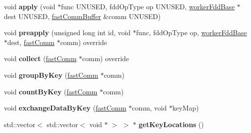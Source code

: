 \begin{DoxyCompactItemize}
\item 
\hypertarget{classfaster_1_1workerFdd_a7b54fa501fd3cd31a27b95cc55b6235a}{}void {\bfseries apply} (void $\ast$func U\+N\+U\+S\+E\+D, fdd\+Op\+Type op U\+N\+U\+S\+E\+D, \hyperlink{classfaster_1_1workerFddBase}{worker\+Fdd\+Base} $\ast$dest U\+N\+U\+S\+E\+D, \hyperlink{classfaster_1_1fastCommBuffer}{fast\+Comm\+Buffer} \&comm U\+N\+U\+S\+E\+D)\label{classfaster_1_1workerFdd_a7b54fa501fd3cd31a27b95cc55b6235a}

\item 
\hypertarget{classfaster_1_1workerFdd_a245c74dd6908a15c8e4310e21c25f867}{}void {\bfseries preapply} (unsigned long int id, void $\ast$func, fdd\+Op\+Type op, \hyperlink{classfaster_1_1workerFddBase}{worker\+Fdd\+Base} $\ast$dest, \hyperlink{classfaster_1_1fastComm}{fast\+Comm} $\ast$comm) override\label{classfaster_1_1workerFdd_a245c74dd6908a15c8e4310e21c25f867}

\item 
\hypertarget{classfaster_1_1workerFdd_a429828080212db643940e5761b9bc27c}{}void {\bfseries collect} (\hyperlink{classfaster_1_1fastComm}{fast\+Comm} $\ast$comm) override\label{classfaster_1_1workerFdd_a429828080212db643940e5761b9bc27c}

\item 
\hypertarget{classfaster_1_1workerFdd_a4e4649c682140139aa4d8e7612086bfd}{}void {\bfseries group\+By\+Key} (\hyperlink{classfaster_1_1fastComm}{fast\+Comm} $\ast$comm)\label{classfaster_1_1workerFdd_a4e4649c682140139aa4d8e7612086bfd}

\item 
\hypertarget{classfaster_1_1workerFdd_a4be02069920848e005273f560e99b3c8}{}void {\bfseries count\+By\+Key} (\hyperlink{classfaster_1_1fastComm}{fast\+Comm} $\ast$comm)\label{classfaster_1_1workerFdd_a4be02069920848e005273f560e99b3c8}

\item 
\hypertarget{classfaster_1_1workerFdd_a125d58b5669006099a3ce4fd7042413a}{}void {\bfseries exchange\+Data\+By\+Key} (\hyperlink{classfaster_1_1fastComm}{fast\+Comm} $\ast$comm, void $\ast$key\+Map)\label{classfaster_1_1workerFdd_a125d58b5669006099a3ce4fd7042413a}

\item 
\hypertarget{classfaster_1_1workerFdd_a997160b60444b89810515ad572b0e884}{}std\+::vector$<$ std\+::vector$<$ void $\ast$ $>$ $>$ $\ast$ {\bfseries get\+Key\+Locations} ()\label{classfaster_1_1workerFdd_a997160b60444b89810515ad572b0e884}

\end{DoxyCompactItemize}

